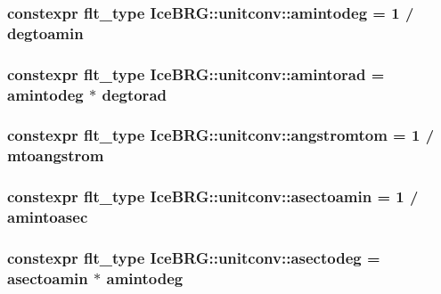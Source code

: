 \subsubsection[{amintodeg}]{\setlength{\rightskip}{0pt plus 5cm}constexpr {\bf flt\+\_\+type} Ice\+B\+R\+G\+::unitconv\+::amintodeg = 1 / {\bf degtoamin}}\label{namespaceIceBRG_1_1unitconv_a9f2c4441a3294623935c4f9d11bf23b6}
\hypertarget{namespaceIceBRG_1_1unitconv_a9be38bf31fba01dc35895cfc68c78cd4}{}
\subsubsection[{amintorad}]{\setlength{\rightskip}{0pt plus 5cm}constexpr {\bf flt\+\_\+type} Ice\+B\+R\+G\+::unitconv\+::amintorad = {\bf amintodeg} $\ast$ {\bf degtorad}}\label{namespaceIceBRG_1_1unitconv_a9be38bf31fba01dc35895cfc68c78cd4}
\hypertarget{namespaceIceBRG_1_1unitconv_a053e8f3a83efad4b7ffa6d8c6e2fa2e5}{}
\subsubsection[{angstromtom}]{\setlength{\rightskip}{0pt plus 5cm}constexpr {\bf flt\+\_\+type} Ice\+B\+R\+G\+::unitconv\+::angstromtom = 1 / {\bf mtoangstrom}}\label{namespaceIceBRG_1_1unitconv_a053e8f3a83efad4b7ffa6d8c6e2fa2e5}
\hypertarget{namespaceIceBRG_1_1unitconv_a69006baf9666f8b3eadf372f11c21d3d}{}
\subsubsection[{asectoamin}]{\setlength{\rightskip}{0pt plus 5cm}constexpr {\bf flt\+\_\+type} Ice\+B\+R\+G\+::unitconv\+::asectoamin = 1 / {\bf amintoasec}}\label{namespaceIceBRG_1_1unitconv_a69006baf9666f8b3eadf372f11c21d3d}
\hypertarget{namespaceIceBRG_1_1unitconv_a423c3f9f72df329bc63f5401785a09d2}{}
\subsubsection[{asectodeg}]{\setlength{\rightskip}{0pt plus 5cm}constexpr {\bf flt\+\_\+type} Ice\+B\+R\+G\+::unitconv\+::asectodeg = {\bf asectoamin} $\ast$ {\bf amintodeg}}\label{namespaceIceBRG_1_1unitconv_a423c3f9f72df329bc63f5401785a09d2}
\hypertarget{namespaceIceBRG_1_1unitconv_aac89183abac5a460b75c78424824797c}{}

